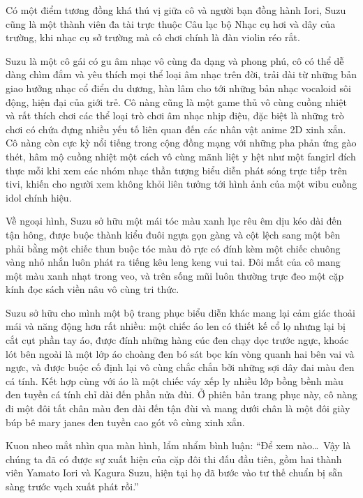 \documentclass[../main.tex]{subfiles}
\begin{document}
Có một điểm tương đồng khá thú vị giữa cô và người bạn đồng hành Iori, Suzu cũng là một thành viên đa tài trực thuộc Câu lạc bộ Nhạc cụ hơi và dây của trường, khi nhạc cụ sở trường mà cô chơi chính là đàn violin réo rắt.

Suzu là một cô gái có gu âm nhạc vô cùng đa dạng và phong phú, cô có thể dễ dàng chìm đắm và yêu thích mọi thể loại âm nhạc trên đời, trải dài từ những bản giao hưởng nhạc cổ điển du dương, hàn lâm cho tới những bản nhạc vocaloid sôi động, hiện đại của giới trẻ. Cô nàng cũng là một game thủ vô cùng cuồng nhiệt và rất thích chơi các thể loại trò chơi âm nhạc nhịp điệu, đặc biệt là những trò chơi có chứa đựng nhiều yếu tố liên quan đến các nhân vật anime 2D xinh xắn. Cô nàng còn cực kỳ nổi tiếng trong cộng đồng mạng với những pha phản ứng gào thét, hâm mộ cuồng nhiệt một cách vô cùng mãnh liệt y hệt như một fangirl đích thực mỗi khi xem các nhóm nhạc thần tượng biểu diễn phát sóng trực tiếp trên tivi, khiến cho người xem không khỏi liên tưởng tới hình ảnh của một wibu cuồng idol chính hiệu.

Về ngoại hình, Suzu sở hữu một mái tóc màu xanh lục rêu êm dịu kéo dài đến tận hông, được buộc thành kiểu đuôi ngựa gọn gàng và cột lệch sang một bên phải bằng một chiếc thun buộc tóc màu đỏ rực có đính kèm một chiếc chuông vàng nhỏ nhắn luôn phát ra tiếng kêu leng keng vui tai. Đôi mắt của cô mang một màu xanh nhạt trong veo, và trên sống mũi luôn thường trực đeo một cặp kính đọc sách viền nâu vô cùng tri thức.

Suzu sở hữu cho mình một bộ trang phục biểu diễn khác mang lại cảm giác thoải mái và năng động hơn rất nhiều: một chiếc áo len có thiết kế cổ lọ nhưng lại bị cắt cụt phần tay áo, được đính những hàng cúc đen chạy dọc trước ngực, khoác lót bên ngoài là một lớp áo choàng đen bó sát bọc kín vòng quanh hai bên vai và ngực, và được buộc cố định lại vô cùng chắc chắn bởi những sợi dây đai màu đen cá tính. Kết hợp cùng với áo là một chiếc váy xếp ly nhiều lớp bồng bềnh màu đen tuyền cá tính chỉ dài đến phần nửa đùi. Ở phiên bản trang phục này, cô nàng đi một đôi tất chân màu đen dài đến tận đùi và mang dưới chân là một đôi giày búp bê mary janes đen tuyền cao gót vô cùng xinh xắn.

\chrint


Kuon nheo mắt nhìn qua màn hình, lẩm nhẩm bình luận: ``Để xem nào\dots\ Vậy là chúng ta đã có được sự xuất hiện của cặp đôi thi đấu đầu tiên, gồm hai thành viên Yamato Iori và Kagura Suzu, hiện tại họ đã bước vào tư thế chuẩn bị sẵn sàng trước vạch xuất phát rồi.''
\end{document}

